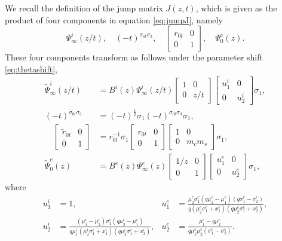 \documentclass[a4paper,reqno,11pt]{amsart}
\numberwithin{equation}{section}
\numberwithin{figure}{section}
\theoremstyle{plain}
\theoremstyle{remark}
\numberwithin{rhp}{section}
\begin{document}
We recall the definition of the jump matrix $J(z,t)$, which is given as the product of four components in equation \eqref{eq:jumpJ}, namely
$$\Psi_\infty^i(z/t),\quad (-t)^{\sigma_{0t}\sigma_3},\quad\begin{bmatrix}r_{0t} & 0\\
    0 & 1\end{bmatrix},\quad\Psi_0^e(z).$$
These four components transform as follows under the parameter shift \eqref{eq:thetashift},
\begin{align*}
\widetilde{\Psi}_\infty^i(z/t)&=B^i(z) \Psi_\infty^i(z/t)\begin{bmatrix}
        1 & 0\\
        0 & z/t
    \end{bmatrix}\begin{bmatrix}
        u_1^i & 0\\
        0 & u_2^i
    \end{bmatrix}\sigma_1,\\
    (-t)^{\widetilde{\sigma}_{0t}\sigma_3}&=(-t)^\frac{1}{2} \sigma_1 (-t)^{\sigma_{0t}\sigma_3} \sigma_1,\\
    \quad\begin{bmatrix}\widetilde{r}_{0t} & 0\\
    0 & 1\end{bmatrix}&=r_{0t}^{-1}\sigma_1\begin{bmatrix}r_{0t} & 0\\
    0 & 1\end{bmatrix}\begin{bmatrix}1 & 0\\
    0 & m_cm_s\end{bmatrix}\sigma_1,\\
    \widetilde{\Psi}_0^e(z)&=
    B^e(z) \Psi_\infty^e(z)\begin{bmatrix}
        1/z & 0\\
        0 & 1
    \end{bmatrix}\begin{bmatrix}
        u_1^e & 0\\
        0 & u_2^e
    \end{bmatrix}\sigma_1,
\end{align*}
where
\begin{align*}
    u_1^i&=1, & u_1^e&=\frac{\mu _2^e \sigma _1^e \left(q\mu _2^e-\mu _1^e\right) \left(q \sigma _1^e-\sigma _2^e\right)}{q \left(\mu _2^e \sigma _1^e+x_1^e\right) \left(q\mu _2^e  \sigma _1^e+x_2^e\right)},\\
    u_2^i&=\frac{\left(\mu _1^i-\mu _2^i\right) \sigma _1^i \left(q\mu _2^i-\mu _1^i\right)}{q\mu _1^i \left(\mu _2^i \sigma _1^i+x_1^i\right) \left(q\mu _2^i\sigma _1^i+x_2^i\right)}, & 
    u_2^e&=\frac{\mu _1^e-q\mu _2^e}{q\mu _1^e \mu _2^e  \left(\sigma _1^e-\sigma _2^e\right)}.
\end{align*}
\end{document}
